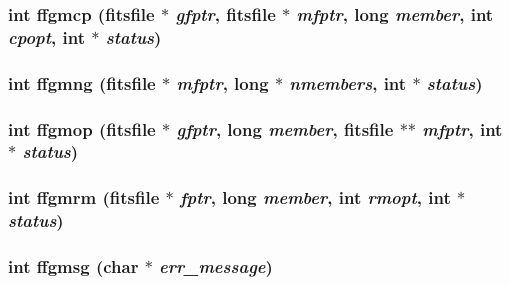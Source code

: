 \subsubsection{\setlength{\rightskip}{0pt plus 5cm}int ffgmcp (\bf{fitsfile} $\ast$ {\em gfptr}, \bf{fitsfile} $\ast$ {\em mfptr}, long {\em member}, int {\em cpopt}, int $\ast$ {\em status})}\label{test_2shm__client_2fitsio_8h_d83bfc8f05c1ecdb704484508df35e48}


\subsubsection{\setlength{\rightskip}{0pt plus 5cm}int ffgmng (\bf{fitsfile} $\ast$ {\em mfptr}, long $\ast$ {\em nmembers}, int $\ast$ {\em status})}\label{test_2shm__client_2fitsio_8h_4ce8704aab9e63b3a93ccbf135f20eab}


\subsubsection{\setlength{\rightskip}{0pt plus 5cm}int ffgmop (\bf{fitsfile} $\ast$ {\em gfptr}, long {\em member}, \bf{fitsfile} $\ast$$\ast$ {\em mfptr}, int $\ast$ {\em status})}\label{test_2shm__client_2fitsio_8h_eb970a59dfa22c61d5df8bc212391228}


\subsubsection{\setlength{\rightskip}{0pt plus 5cm}int ffgmrm (\bf{fitsfile} $\ast$ {\em fptr}, long {\em member}, int {\em rmopt}, int $\ast$ {\em status})}\label{test_2shm__client_2fitsio_8h_ae2190c557659d6bea87a6ba2e5c152b}


\subsubsection{\setlength{\rightskip}{0pt plus 5cm}int ffgmsg (char $\ast$ {\em err\_\-message})}\label{test_2shm__client_2fitsio_8h_778ec78df3764f3a5928aa564a4874a8}


